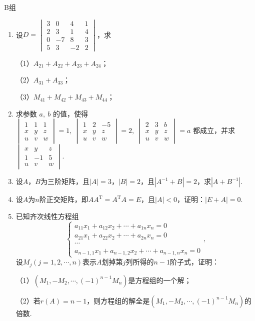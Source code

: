 \centerline{\heiti B组}
\begin{enumerate}
	\item 设$D=\begin{vmatrix}
		3 & 0 & 4 & 1 \\ 2 & 3 & 1 & 4 \\ 0 & -7 & 8 & 3 \\ 5 & 3 & -2 & 2
	\end{vmatrix}$，求

	（1）$A_{21}+A_{22}+A_{23}+A_{24}$；

	（2）$A_{31}+A_{33}$；

	（3）$M_{41}+M_{42}+M_{43}+M_{44}$；
	\item 求参数 $a,\ b$  的值，使得 $\begin{vmatrix}1 & 1 & 1 \\ x & y & z \\u & v & w\end{vmatrix}=1,\ \begin{vmatrix}1 & 2 & -5 \\ x & y & z \\u & v & w\end{vmatrix}=2,\ \begin{vmatrix}2 & 3 & b \\ x & y & z \\u & v & w\end{vmatrix}=a$ 都成立，并求$\begin{vmatrix}x & y & z \\ 1 & -1 & 5 \\u & v & w\end{vmatrix}$.
	\item 设$A$，$B$为三阶矩阵，且$|A|=3$，$|B|=2$，且$|A^{-1}+B|=2$，求$|A+B^{-1}|$.
	\item 设$A$为$n$阶正交矩阵，即$AA^\mathrm{T}=A^\mathrm{T}A=E$，且$|A|<0$，证明：$|E+A|=0$.
	\item 已知齐次线性方程组$$\begin{cases}
		a_{11}x_1+a_{12}x_2+\cdots+a_{1n}x_n=0 \\
		a_{21}x_1+a_{22}x_2+\cdots+a_{2n}x_n=0 \\
		\cdots \\
		a_{n-1,1}x_1+a_{n-1,2}x_2+\cdots+a_{n-1,n}x_n=0
	\end{cases},$$设$M_j(j=1,2,\cdots,n)$表示$A$划掉第$j$列所得的$n-1$阶子式，证明：

	（1）$(M_1,-M_2,\cdots,(-1)^{n-1}M_n)$是方程组的一个解；

	（2）若$r(A)=n-1$，则方程组的解全是$(M_1,-M_2,\cdots,(-1)^{n-1}M_n)$的倍数.
\end{enumerate}

